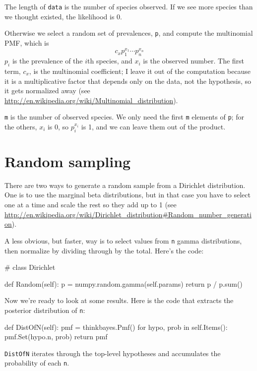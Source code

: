 \documentclass[12pt]{book}
\theoremstyle{exercise}
\begin{document}
The length of {\tt data} is the number of species observed.  If
we see more species than we thought existed, the likelihood is 0.

Otherwise we select a random set of prevalences, {\tt p}, and
compute the multinomial PMF, which is
%
\[ c_x  p_1^{x_1} \cdots p_n^{x_n} \]
%
$p_i$ is the prevalence of the $i$th species, and $x_i$ is the
observed number.  The first term, $c_x$, is the multinomial
coefficient; I leave it out of the computation because it is
a multiplicative factor that depends only
on the data, not the hypothesis, so it gets normalized away
(see \url{http://en.wikipedia.org/wiki/Multinomial_distribution}).

{\tt m} is the number of observed species.
We only need the first {\tt m} elements of {\tt p};
for the others, $x_i$ is 0, so
$p_i^{x_i}$ is 1, and we can leave them out of the product.


\section{Random sampling}
\label{randomdir}

There are two ways to generate a random sample from a Dirichlet
distribution.  One is to use the marginal beta distributions, but in
that case you have to select one at a time and scale the rest so they
add up to 1 (see
\url{http://en.wikipedia.org/wiki/Dirichlet_distribution#Random_number_generation}).

A less obvious, but faster, way is to select values from {\tt n} gamma
distributions, then normalize by dividing through by the total. 
Here's the code:

\begin{code}
# class Dirichlet

    def Random(self):
        p = numpy.random.gamma(self.params)
        return p / p.sum()
\end{code}

Now we're ready to look at some results.  Here is the code that extracts
the posterior distribution of {\tt n}:

\begin{code}
    def DistOfN(self):
        pmf = thinkbayes.Pmf()
        for hypo, prob in self.Items():
            pmf.Set(hypo.n, prob)
        return pmf
\end{code}

{\tt DistOfN} iterates
through the top-level hypotheses and accumulates the probability
of each {\tt n}.
\end{document}
